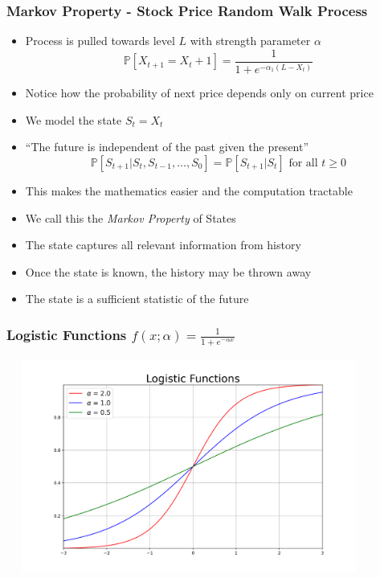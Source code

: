 \documentclass[handout]{beamer}
\begin{document}
\begin{frame}
\frametitle{Markov Property - Stock Price Random Walk Process}
\pause
\begin{itemize}[<+->]
\item Process is pulled towards level $L$ with strength parameter $\alpha$
$$\mathbb{P}[X_{t+1} = X_t + 1] = \frac 1 {1 + e^{-\alpha_1(L - X_t)}}$$
\item Notice how the probability of next price depends only on current price
\item We model the state $S_t = X_t$
\item ``The future is independent of the past given the present''
$$\mathbb{P}[S_{t+1}|S_t, S_{t-1}, \ldots, S_0] = \mathbb{P}[S_{t+1}|S_t]\text{ for all } t \geq 0$$
\item This makes the mathematics easier and the computation tractable
\item We call this the {\em Markov Property} of States
\item The state captures all relevant information from history
\item Once the state is known, the history may be thrown away
\item The state is a sufficient statistic of the future
\end{itemize}
\end{frame}

\begin{frame}
\frametitle{Logistic Functions $f(x;\alpha) = \frac 1 {1 + e^{-\alpha x}}$}
\includegraphics[width=12cm, height=7cm]{logistic_curves.png}
\end{frame}
\end{document}
